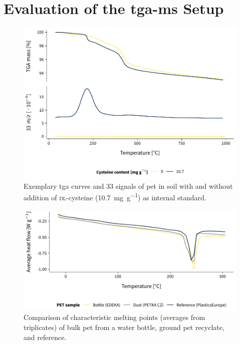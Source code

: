 
\chapter{Evaluation of the \Acs{tga-ms} Setup}
\label{ap:tga-ms-method}

\begin{figure}
	\includegraphics[width=\textwidth]{figures/cysteine-comparison}
	\caption[Exemplary \ac{tga} curves and \SI{33}{\mz} signals of \ac{pet} in soil with and without \textsc{dl}-cysteine as internal standard.]{Exemplary \ac{tga} curves and \SI{33}{\mz} signals of \ac{pet} in soil with and without addition of \textsc{dl}-cysteine (\SI{10.7}{\milli\gram\per\gram}) as internal standard.}
	\label{fig:cysteine-comparison}
\end{figure}

\begin{figure}
	\includegraphics[width=\textwidth]{figures/dsc}
	\caption[Comparison of characteristic melting points of bulk \ac{pet} from a water bottle, ground \ac{pet} recyclate, and  reference.]{Comparison of characteristic melting points (averages from triplicates) of bulk \ac{pet} from a water bottle, ground \ac{pet} recyclate, and  reference.}
	\label{fig:dsc}
\end{figure}

